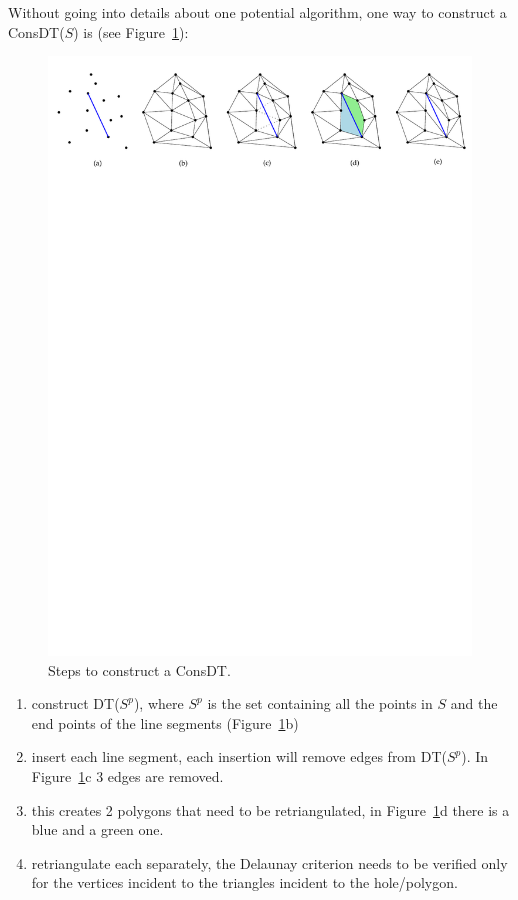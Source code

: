 %

Without going into details about one potential algorithm, one way to construct a ConsDT($S$) is (see Figure~\ref{fig:cdt_steps}):
\begin{figure}
  \centering
  \includegraphics[width=0.95\linewidth]{cdt_steps}
  \caption{Steps to construct a ConsDT.}%
\label{fig:cdt_steps}
\end{figure}
\begin{enumerate}
  \item construct DT($S^p$), where $S^p$ is the set containing all the points in $S$ and the end points of the line segments (Figure~\ref{fig:cdt_steps}b)
  \item insert each line segment, each insertion will remove edges from DT($S^p$). In Figure~\ref{fig:cdt_steps}c 3 edges are removed.
  \item this creates 2 polygons that need to be retriangulated, in Figure~\ref{fig:cdt_steps}d there is a blue and a green one.
  \item retriangulate each separately, the Delaunay criterion needs to be verified only for the vertices incident to the triangles incident to the hole/polygon.
\end{enumerate}

